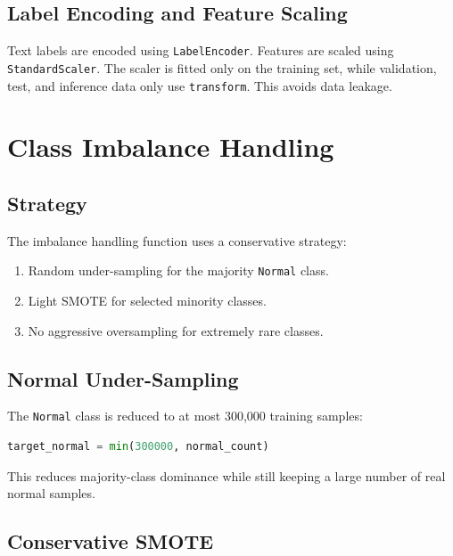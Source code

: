 \documentclass[12pt,a4paper]{article}
\begin{document}
\subsection{Label Encoding and Feature Scaling}

Text labels are encoded using \texttt{LabelEncoder}. Features are scaled using \texttt{StandardScaler}. The scaler is fitted only on the training set, while validation, test, and inference data only use \texttt{transform}. This avoids data leakage.

\section{Class Imbalance Handling}

\subsection{Strategy}

The imbalance handling function uses a conservative strategy:

\begin{enumerate}
    \item Random under-sampling for the majority \texttt{Normal} class.
    \item Light SMOTE for selected minority classes.
    \item No aggressive oversampling for extremely rare classes.
\end{enumerate}

\subsection{Normal Under-Sampling}

The \texttt{Normal} class is reduced to at most 300,000 training samples:

\begin{lstlisting}[language=Python]
target_normal = min(300000, normal_count)
\end{lstlisting}

This reduces majority-class dominance while still keeping a large number of real normal samples.

\subsection{Conservative SMOTE}
\end{document}
